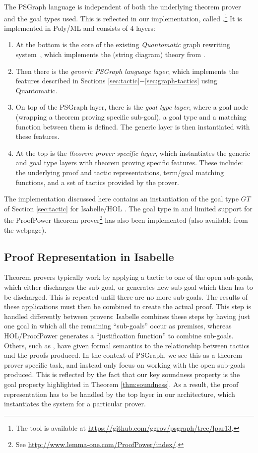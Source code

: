 \documentclass{llncs}
\begin{document}
The PSGraph language is independent of both the underlying theorem prover and the goal types used. This is reflected in  our implementation, called \psgraphtool{}.\footnote{The tool is available at \url{https://github.com/ggrov/psgraph/tree/lpar13}.} It is implemented in
Poly/ML and consists of $4$ layers:
\begin{enumerate}
\item At the bottom is the core of the existing \emph{Quantomatic} graph rewriting system~\cite{Quantomatic}, which implements the (string diagram) theory from \cite{paper:Dixon:10}.
\item Then there is the \emph{generic PSGraph language layer}, which implements the features
described in Sections \ref{sec:tactic}$-$\ref{sec:graph-tactics} using Quantomatic.
\item On top of the PSGraph layer, there is the \emph{goal type layer}, where a goal node (wrapping a theorem proving specific sub-goal), a goal type and a matching function between them is defined. The generic layer is then instantiated with these features.
\item At the top is the \emph{theorem prover specific layer}, which instantiates the generic and goal type layers with theorem proving specific features. These include: the underlying proof and tactic representations, term/goal matching functions, and a set of tactics provided by the prover.
\end{enumerate}
The implementation discussed here contains an instantiation of the goal type $GT$ of Section \ref{sec:tactic} for Isabelle/HOL \cite{paper:Paulson:90}. The goal type in \cite{grov13a} and limited support for
the ProofPower theorem prover\footnote{See \url{http://www.lemma-one.com/ProofPower/index/}.} has also been implemented (also available from the \psgraphtool{} webpage).

\beforesection
\subsection{Proof Representation in Isabelle}
\aftersection

Theorem provers typically work by applying a tactic to one of the open sub-goals,
which either discharges the sub-goal, or generates new sub-goal which then has to
be discharged. This is repeated until there are no more sub-goals. The results of these applications must then be combined to create the actual proof. This step is handled
differently between provers: Isabelle combines these steps by having just one goal in which all the remaining ``sub-goals'' occur as premises, whereas HOL/ProofPower generates a ``justification function'' to combine sub-goals. Others, such as \cite{paper:Aspinall:2008,paper:Whiteside:11,Stampoulis10},
have given formal semantics to the relationship between tactics and 
the proofs produced. In the context of PSGraph, we see this as a theorem prover
specific task, and instead only focus on working with the open sub-goals produced. 
This is reflected by the fact that our key soundness property is the goal property highlighted in 
Theorem \ref{thm:soundness}. As a result, the proof representation has to be handled by the top layer in our architecture,
which instantiates the system for a particular prover.
\end{document}
